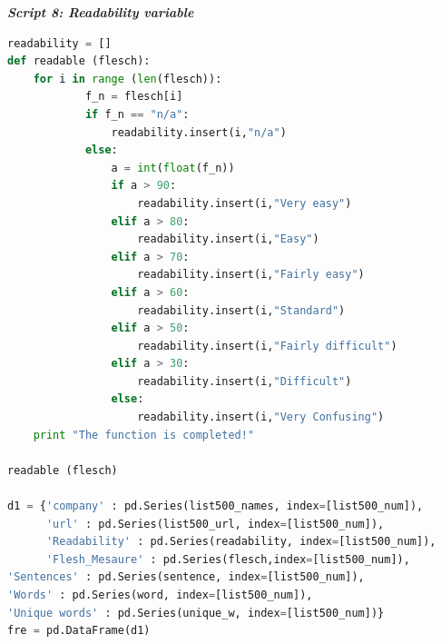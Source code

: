 \documentclass{book}
\begin{document}
\begin{center}
\textit{\textbf{Script 8: Readability variable}}\label{p8}
\end{center}
\begin{lstlisting}[language=Python]
readability = []
def readable (flesch):
    for i in range (len(flesch)):
            f_n = flesch[i]
            if f_n == "n/a":
                readability.insert(i,"n/a")                
            else:
                a = int(float(f_n))
                if a > 90:    
                    readability.insert(i,"Very easy")                    
                elif a > 80:
                    readability.insert(i,"Easy")
                elif a > 70:
                    readability.insert(i,"Fairly easy")
                elif a > 60:
                    readability.insert(i,"Standard")
                elif a > 50:
                    readability.insert(i,"Fairly difficult")
                elif a > 30:
                    readability.insert(i,"Difficult")
                else:
                    readability.insert(i,"Very Confusing")                    
    print "The function is completed!"

readable (flesch)

d1 = {'company' : pd.Series(list500_names, index=[list500_num]),
      'url' : pd.Series(list500_url, index=[list500_num]),
      'Readability' : pd.Series(readability, index=[list500_num]),
      'Flesh_Mesaure' : pd.Series(flesch,index=[list500_num]),
'Sentences' : pd.Series(sentence, index=[list500_num]),
'Words' : pd.Series(word, index=[list500_num]),
'Unique words' : pd.Series(unique_w, index=[list500_num])}
fre = pd.DataFrame(d1)    
\end{lstlisting}
\end{document}
